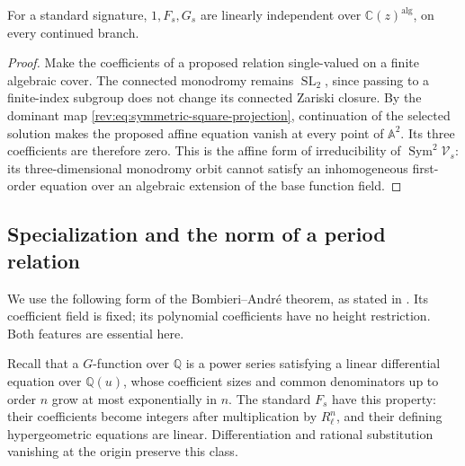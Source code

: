 \begin{lemma}
\label{lem:C-functional-affine-independence}
For a standard signature, $1,F_s,G_s$ are linearly independent over
$\mathbb C(z)^{\mathrm{alg}}$, on every continued branch.
\end{lemma}
\begin{proof}
Make the coefficients of a proposed relation single-valued on a finite
algebraic cover.  The connected monodromy remains
$\operatorname{SL}_2$, since passing to a finite-index subgroup does
not change its connected Zariski closure.  By the dominant map
\eqref{rev:eq:symmetric-square-projection}, continuation of the
selected solution makes the proposed affine equation vanish at every
point of $\mathbb A^2$.  Its three coefficients are therefore zero.
This is the affine form of irreducibility of
$\operatorname{Sym}^2\mathcal V_s$: its three-dimensional monodromy
orbit cannot satisfy an inhomogeneous first-order equation over an
algebraic extension of the base function field.
\end{proof}

\subsection{Specialization and the norm of a period relation}

We use the following form of the Bombieri--Andr\'e theorem, as stated
in \cite[Theorem~3.13 and Remark~3.14]{BaldiBinyaminiUrbanik2026}.
Its coefficient field is fixed; its polynomial coefficients have no
height restriction.  Both features are essential here.

Recall that a $G$-function over $\mathbb Q$ is a power series satisfying
a linear differential equation over $\mathbb Q(u)$, whose coefficient
sizes and common denominators up to order $n$ grow at most exponentially
in $n$.  The standard $F_s$ have this property: their coefficients become
integers after multiplication by $R_\ell^n$, and their defining
hypergeometric equations are linear.  Differentiation and rational
substitution vanishing at the origin preserve this class.

